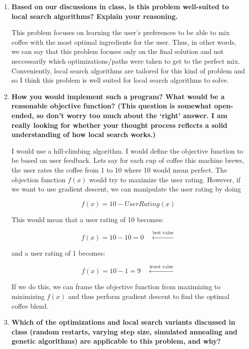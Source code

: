 \documentclass[a4paper]{article}
\begin{document}
\begin{sloppypar}
\begin{enumerate}[start=9,label=Q\arabic*,left=0pt]
    \item \textbf{Based on our discussions in class, is this problem well-suited to local search algorithms? Explain your reasoning.}
    \par This problem focuses on learning the user's preferences to be able to mix coffee with the most optimal
    ingredients for the user. Thus, in other words, we can say that this problem focuses only on the final solution and not neccessarily
    which optimizations/paths were taken to get to the perfect mix. Conveniently, local search algorithms are tailored
    for this kind of problem and so I think this problem is well suited for local search algorithms to solve.
    
    \item \textbf{How you would implement such a program? What would be a reasonable objective function? (This question is somewhat open-ended, so don’t worry too much about the ‘right’ answer. I am really looking for whether your thought process reflects a solid understanding of how local search works.)}
    \par I would use a hill-climbing algorithm. I would define the objective function to be based on user feedback.
    Lets say for each cup of coffee this machine brews, the user rates the coffee from 1 to 10 where 10 would mean perfect.
    The objection function $f(x)$ would try to maximize the user rating. However, if we want to use gradient descent, we can manipulate the 
    user rating by doing 
    
    \[f(x) = 10 - User Rating(x)\]

    This would mean that a user rating of 10 becomes:

    \[ f(x) = 10 - 10 = 0 \quad \xleftarrow{\text{best value}} \]

    and a user rating of 1 becomes:

    \[ f(x) = 10 - 1 = 9 \quad \xleftarrow{\text{worst value}} \]

    If we do this, we can frame the objective function from maximizing to minimizing $f(x)$ and thus perform gradient descent
    to find the optimal coffee blend.

    \item \textbf{Which of the optimizations and local search variants discussed in class (random restarts, varying step size, simulated annealing and genetic algorithms) are applicable to this problem, and why?}


\end{enumerate}
\end{sloppypar}
\end{document}
